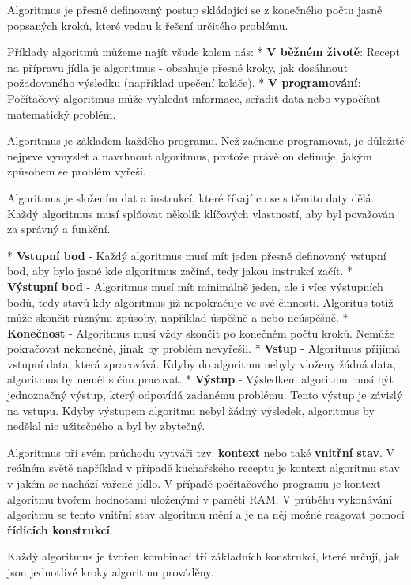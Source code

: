 
Algoritmus je přesně definovaný postup skládající se z konečného počtu jasně popsaných kroků, které vedou k řešení určitého problému.

Příklady algoritmů můžeme najít všude kolem nás:
\begitems
* {\bf V běžném životě}: Recept na přípravu jídla je algoritmus - obsahuje přesné kroky, jak dosáhnout požadovaného výsledku (například upečení koláče).
* {\bf V programování}: Počítačový algoritmus může vyhledat informace, seřadit data nebo vypočítat matematický problém.
\enditems

Algoritmus je základem každého programu. Než začneme programovat, je důležité nejprve vymyslet a navrhnout algoritmus, protože právě on definuje, jakým způsobem se problém vyřeší.

Algoritmus je složením dat a instrukcí, které říkají co se s těmito daty dělá. Každý algoritmus musí splňovat několik klíčových vlastností, aby byl považován za správný a funkční.

\begitems
* {\bf Vstupní bod} - Každý algoritmus musí mít jeden přesně definovaný vstupní bod, aby bylo jasné kde algoritmus začíná, tedy jakou instrukcí začít.
* {\bf Výstupní bod} - Algoritmus musí mít minimálně jeden, ale i více výstupních bodů, tedy stavů kdy algoritmus již nepokračuje ve své činnosti. Algoritus totiž může skončit různými způsoby, například úspěšně a nebo neúspěšně.
* {\bf Konečnost} - Algoritmus musí vždy skončit po konečném počtu kroků. Nemůže pokračovat nekonečně, jinak by problém nevyřešil.
* {\bf Vstup} - Algoritmus přijímá vstupní data, která zpracovává. Kdyby do algoritmu nebyly vloženy žádná data, algoritmus by neměl s čím pracovat.
* {\bf Výstup} - Výsledkem algoritmu musí být jednoznačný výstup, který odpovídá zadanému problému. Tento výstup je závislý na vstupu. Kdyby výstupem algoritmu nebyl žádný výsledek, algoritmus by nedělal nic užitečného a byl by zbytečný.
\enditems

Algoritmus při svém průchodu vytváři tzv. {\bf kontext} nebo také {\bf vnitřní stav}. V reálném světě například v případě kuchařského receptu je kontext algoritmu stav v jakém se nachází vařené jídlo. V případě počítačového programu je kontext algoritmu tvořem hodnotami uloženými v paměti RAM. V průběhu vykonávání algoritmu se tento vnitřní stav algoritmu mění a je na něj možné reagovat pomocí {\bf řídících konstrukcí}. 

Každý algoritmus je tvořen kombinací tří základních konstrukcí, které určují, jak jsou jednotlivé kroky algoritmu prováděny.

